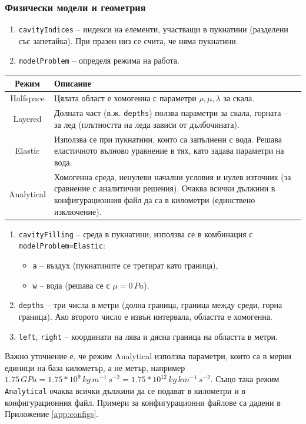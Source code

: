 \documentclass{report}
\begin{document}
	\subsubsection*{Физически модели и геометрия}
	\begin{enumerate}[resume, label=\roman*)]
		\item \texttt{cavityIndices} – индекси на елементи, участващи в пукнатини (разделени със запетайка). При празен низ се счита, че няма пукнатини.
		\item \texttt{modelProblem} – определя режима на работа.
	\end{enumerate}
	
	\begin{center}
		\begin{tabular}{|c|p{10cm}|}
			\hline
			\textbf{Режим} & \textbf{Описание} \\
			\hline
			Halfspace & Цялата област е хомогенна с параметри $\rho,\mu,\lambda$ за скала. \\
			\hline
			Layered & Долната част (в.ж. \texttt{depths}) ползва параметри за скала, горната – за лед (плътността на леда зависи от дълбочината). \\
			\hline
			Elastic & Използва се при пукнатини, които са запълнени с вода. Решава еластичното вълново уравнение в тях, като задава параметри на вода. \\
			\hline
			Analytical & Хомогенна среда, ненулеви начални условия и нулев източник (за сравнение с аналитични решения). Очаква всички дължини в конфигурационния файл да са в километри (единствено изключение).\\
			\hline
		\end{tabular}
	\end{center}
	
	\begin{enumerate}[resume, label=\roman*)]
		\item \texttt{cavityFilling} – среда в пукнатини; използва се в комбинация с \texttt{modelProblem=Elastic}:
		\begin{itemize}
			\item \texttt{a} – въздух (пукнатините се третират като граница),
			\item \texttt{w} – вода (решава се с $\mu=0\,Pa$).
		\end{itemize}
		\item \texttt{depths} – три числа в метри (долна граница, граница между среди, горна граница). 
		Ако второто число е извън интервала, областта е хомогенна.
		\item \texttt{left}, \texttt{right} – координати на лява и дясна граница на областта в метри.
	\end{enumerate}
	Важно уточнение е, че режим Analytical използва параметри, които са в мерни единици на база километър, а не метър, например $1.75\,GPa = 1.75*10^9\,kg\,m^{-1}\,s^{-2}=1.75*10^{12}\,kg\,km^{-1}\,s^{-2}$. Също така режим \texttt{Analytical} очаква всички дължини да се подават в километри и в конфигурационния файл.
	Примери за конфигурационни файлове са дадени в Приложение \ref{app:configs}.
\end{document}
